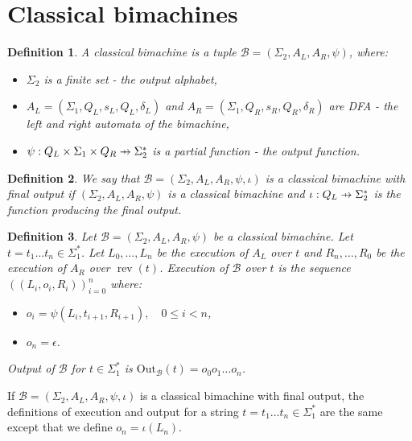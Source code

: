 \documentclass{article}
\newtheorem{definition}{Definition}[section]
\newcommand\pfun{\mathrel{\ooalign{\hfil$\mapstochar\mkern5mu$\hfil\cr$\to$\cr}}}
\DeclareMathOperator{\rev}{rev}
\begin{document}
	\section{Classical bimachines} \label{section:BMFO}
	\begin{definition} \label{def:classical_bimachine}
		A classical bimachine is a tuple $\mathcal{B} = (\Sigma_2, A_L, A_R, \psi)$, where:
		\begin{itemize}
			\item $\Sigma_2$ is a finite set - the output alphabet,
			\item $A_L = (\Sigma_1, Q_L, s_L, Q_L, \delta_L)$ and $A_R = (\Sigma_1, Q_R, s_R, Q_R, \delta_R)$ are DFA - the left and right automata of the bimachine,
			\item $\psi: Q_L\times \Sigma_1\times Q_R\pfun \Sigma_2^*$ is a partial function - the output function.
		\end{itemize}
	\end{definition}
	\begin{definition} \label{def:classical_bimachine_with_final_output}
		We say that $\mathcal{B} = (\Sigma_2, A_L, A_R, \psi, \iota)$ is a classical bimachine with final output if $(\Sigma_2, A_L, A_R, \psi)$ is a classical bimachine and $\iota: Q_L\pfun \Sigma_2^*$ is the function producing the final output.
	\end{definition}
	\begin{definition} \label{def:classical_bimachine_execution}
		Let $\mathcal{B} = (\Sigma_2, A_L, A_R, \psi)$ be a classical bimachine.
		Let $t=t_1\ldots t_n\in \Sigma_1^*$.
		Let $L_0, \ldots, L_n$ be the execution of $A_L$ over $t$ and
		$R_n, \ldots, R_0$ be the execution of $A_R$ over $\rev(t)$.
		Execution of $\mathcal{B}$ over $t$ is the sequence $((L_i, o_i, R_i))_{i=0}^n$ where:
		\begin{itemize}
			\item \( o_i = \psi(L_i, t_{i+1}, R_{i+1}), \quad 0\le i < n \),
			\item \( o_n = \epsilon \).
		\end{itemize}
		Output of $\mathcal{B}$ for $t\in\Sigma_1^*$ is
		$\mathrm{Out}_\mathcal{B}(t) = o_0o_1\ldots o_n$.
	\end{definition}
	If $\mathcal{B} = (\Sigma_2, A_L, A_R, \psi, \iota)$ is a classical bimachine with final output, the definitions of execution and output for a string $t=t_1\ldots t_n\in \Sigma_1^*$ are the same except that we define $o_n = \iota(L_n)$.
	
\end{document}
